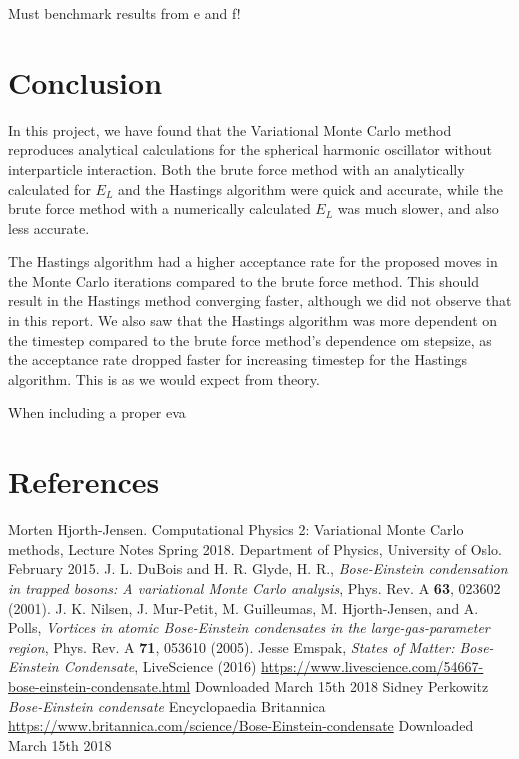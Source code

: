 \documentclass[norsk,a4paper,12pt]{article}
\begin{document}
Must benchmark results from e and f!


\section{Conclusion}

In this project, we have found that the Variational Monte Carlo method reproduces analytical calculations for the spherical harmonic oscillator without interparticle interaction. Both the brute force method with an analytically calculated for $E_L$ and the Hastings algorithm were quick and accurate, while the brute force method with a numerically calculated $E_L$ was much slower, and also less accurate. \par 
The Hastings algorithm had a higher acceptance rate for the proposed moves in the Monte Carlo iterations compared to the brute force method. This should result in the Hastings method converging faster, although we did not observe that in this report. We also saw that the Hastings algorithm was more dependent on the timestep compared to the brute force method's dependence om stepsize, as the acceptance rate dropped faster for increasing timestep for the Hastings algorithm. This is as we would expect from theory.  \par
When including a proper eva




\newpage
\section{References}
\begingroup
\renewcommand{\section}[2]{}
\begin{thebibliography}{}
	Morten Hjorth-Jensen.
	Computational Physics 2: Variational Monte Carlo methods, Lecture Notes Spring 2018.
	Department of Physics, University of Oslo.
	February 2015.
	J. L. DuBois and H. R. Glyde, H. R., \emph{Bose-Einstein condensation in trapped bosons: A variational Monte Carlo analysis}, Phys. Rev. A \textbf{63}, 023602 (2001).
	J. K. Nilsen,  J. Mur-Petit, M. Guilleumas, M. Hjorth-Jensen, and A. Polls, \emph{Vortices in atomic Bose-Einstein condensates in the large-gas-parameter region}, Phys. Rev. A \textbf{71}, 053610 (2005).
	Jesse Emspak, \emph{States of Matter: Bose-Einstein Condensate}, LiveScience (2016)
	\url{https://www.livescience.com/54667-bose-einstein-condensate.html}
	Downloaded March 15th 2018
	Sidney Perkowitz \emph{Bose-Einstein condensate} Encyclopaedia Britannica 
	\url{https://www.britannica.com/science/Bose-Einstein-condensate}
	Downloaded March 15th 2018
\end{thebibliography}
\endgroup
\end{document}
